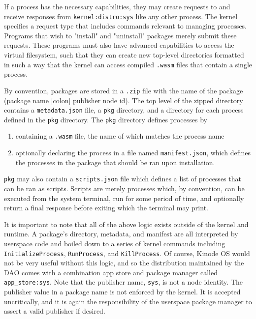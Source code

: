 \documentclass[runningheads]{llncs}
\begin{document}
If a process has the necessary capabilities, they may create requests to and receive responses from \verb|kernel:distro:sys| like any other process.
The kernel specifies a request type that includes commands relevant to managing processes.
Programs that wish to "install" and "uninstall" packages merely submit these requests.
These programs must also have advanced capabilities to access the virtual filesystem, such that they can create new top-level directories formatted in such a way that the kernel can access compiled \verb|.wasm| files that contain a single process.

By convention, packages are stored in a \verb|.zip| file with the name of the package (package name [colon] publisher node id).
The top level of the zipped directory contains a \verb|metadata.json| file, a \verb|pkg| directory, and a directory for each process defined in the \verb|pkg| directory.
The \verb|pkg| directory defines processes by
\begin{enumerate}
    \item containing a \verb|.wasm| file, the name of which matches the process name
    \item optionally declaring the process in a file named \verb|manifest.json|, which defines the processes in the package that should be ran upon installation.
\end{enumerate}

\verb|pkg| may also contain a \verb|scripts.json| file which defines a list of processes that can be ran as scripts.
Scripts are merely processes which, by convention, can be executed from the system terminal, run for some period of time, and optionally return a final response before exiting which the terminal may print.

It is important to note that all of the above logic exists outside of the kernel and runtime.
A package's directory, metadata, and manifest are all interpreted by userspace code and boiled down to a series of kernel commands including \verb|InitializeProcess|, \verb|RunProcess|, and \verb|KillProcess|.
Of course, Kinode OS would not be very useful without this logic, and so the distribution maintained by the DAO comes with a combination app store and package manager called \verb|app_store:sys|.
Note that the publisher name, \verb|sys|, is not a node identity.
The publisher value in a package name is not enforced by the kernel.
It is accepted uncritically, and it is again the responsibility of the userspace package manager to assert a valid publisher if desired.
\end{document}
